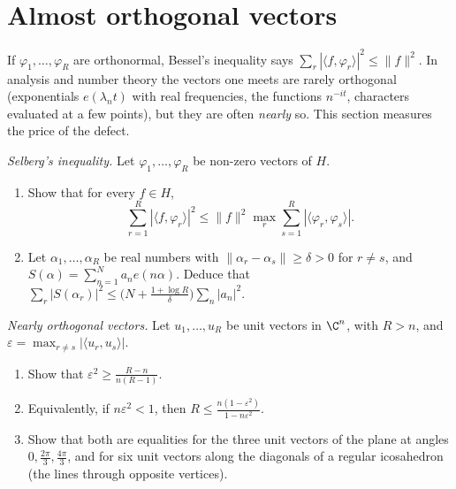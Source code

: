 \section{Almost orthogonal vectors}

If $\varphi_1,\dots,\varphi_R$ are orthonormal, Bessel's inequality says $\sum_r|\langle f,\varphi_r\rangle|^2\le\|f\|^2$. In analysis and
number theory the vectors one meets are rarely orthogonal (exponentials $e(\lambda_nt)$ with real frequencies, the functions $n^{-it}$,
characters evaluated at a few points), but they are often \emph{nearly} so. This section measures the price of the defect.

\begin{exercise}[$\star$]\label{pb:selberg}
\emph{Selberg's inequality.} Let $\varphi_1,\dots,\varphi_R$ be non-zero vectors of $H$.
\begin{enumerate}[label=(\alph*)]
\item Show that for every $f\in H$,
\[
\sum_{r=1}^R|\langle f,\varphi_r\rangle|^2\le\|f\|^2\max_{r}\sum_{s=1}^R|\langle\varphi_r,\varphi_s\rangle|.
\]
\item Let $\alpha_1,\dots,\alpha_R$ be real numbers with $\|\alpha_r-\alpha_s\|\ge\delta>0$ for $r\ne s$, and $S(\alpha)=\sum_{n=1}^Na_ne(n\alpha)$.
Deduce that $\sum_r|S(\alpha_r)|^2\le\bigl(N+\frac{1+\log R}\delta\bigr)\sum_n|a_n|^2$.
\end{enumerate}
\end{exercise}

\begin{exercise}[$\star\star$]\label{pb:welch}
\emph{Nearly orthogonal vectors.} Let $u_1,\dots,u_R$ be unit vectors in $\C^n$, with $R>n$, and $\varepsilon=\max_{r\ne s}|\langle u_r,u_s\rangle|$.
\begin{enumerate}[label=(\alph*)]
\item Show that $\varepsilon^2\ge\frac{R-n}{n(R-1)}$.
\item Equivalently, if $n\varepsilon^2<1$, then $R\le\frac{n(1-\varepsilon^2)}{1-n\varepsilon^2}$.
\item Show that both are equalities for the three unit vectors of the plane at angles $0,\frac{2\pi}3,\frac{4\pi}3$, and for six unit vectors
along the diagonals of a regular icosahedron (the lines through opposite vertices).
\end{enumerate}
\end{exercise}

